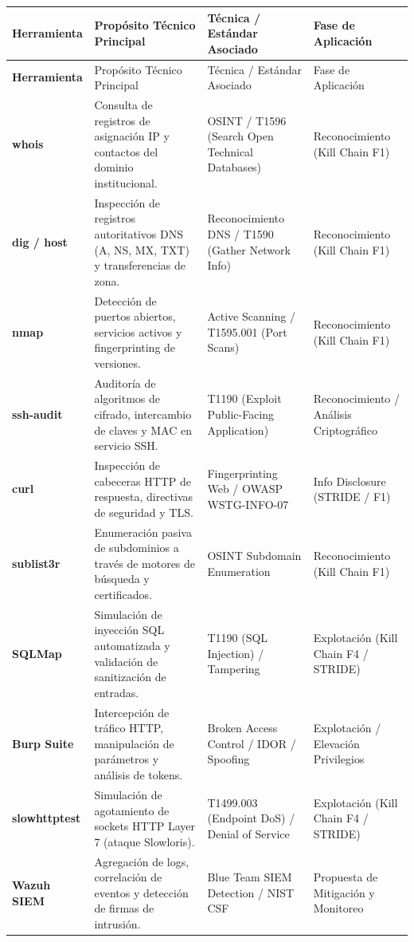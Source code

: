 \begin{center}
\small
\begin{longtable}{>{\bfseries}p{2.8cm} p{4.2cm} p{4.5cm} p{3.2cm}}
\toprule
\rowcolor{outermarginbgcolor}
Herramienta & Propósito Técnico Principal & Técnica / Estándar Asociado & Fase de Aplicación \\
\midrule
\endfirsthead
\toprule
\rowcolor{outermarginbgcolor}
Herramienta & Propósito Técnico Principal & Técnica / Estándar Asociado & Fase de Aplicación \\
\midrule
\endhead
\bottomrule
\endfoot
whois & Consulta de registros de asignación IP y contactos del dominio institucional. & OSINT / T1596 (Search Open Technical Databases) & Reconocimiento (Kill Chain F1) \\
\midrule
dig / host & Inspección de registros autoritativos DNS (A, NS, MX, TXT) y transferencias de zona. & Reconocimiento DNS / T1590 (Gather Network Info) & Reconocimiento (Kill Chain F1) \\
\midrule
nmap & Detección de puertos abiertos, servicios activos y fingerprinting de versiones. & Active Scanning / T1595.001 (Port Scans) & Reconocimiento (Kill Chain F1) \\
\midrule
ssh-audit & Auditoría de algoritmos de cifrado, intercambio de claves y MAC en servicio SSH. & T1190 (Exploit Public-Facing Application) & Reconocimiento / Análisis Criptográfico \\
\midrule
curl & Inspección de cabeceras HTTP de respuesta, directivas de seguridad y TLS. & Fingerprinting Web / OWASP WSTG-INFO-07 & Info Disclosure (STRIDE / F1) \\
\midrule
sublist3r & Enumeración pasiva de subdominios a través de motores de búsqueda y certificados. & OSINT Subdomain Enumeration & Reconocimiento (Kill Chain F1) \\
\midrule
SQLMap & Simulación de inyección SQL automatizada y validación de sanitización de entradas. & T1190 (SQL Injection) / Tampering & Explotación (Kill Chain F4 / STRIDE) \\
\midrule
Burp Suite & Intercepción de tráfico HTTP, manipulación de parámetros y análisis de tokens. & Broken Access Control / IDOR / Spoofing & Explotación / Elevación Privilegios \\
\midrule
slowhttptest & Simulación de agotamiento de sockets HTTP Layer 7 (ataque Slowloris). & T1499.003 (Endpoint DoS) / Denial of Service & Explotación (Kill Chain F4 / STRIDE) \\
\midrule
Wazuh SIEM & Agregación de logs, correlación de eventos y detección de firmas de intrusión. & Blue Team SIEM Detection / NIST CSF & Propuesta de Mitigación y Monitoreo \\
\bottomrule
\end{longtable}
\end{center}

